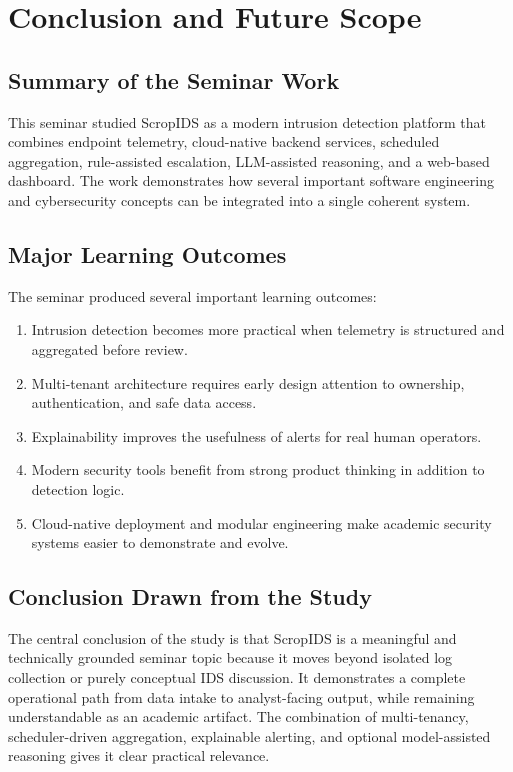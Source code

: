 \documentclass[12pt,a4paper]{report}
\begin{document}
\chapter{Conclusion and Future Scope}

\section{Summary of the Seminar Work}
This seminar studied ScropIDS as a modern intrusion detection platform that combines endpoint telemetry, cloud-native backend services, scheduled aggregation, rule-assisted escalation, LLM-assisted reasoning, and a web-based dashboard. The work demonstrates how several important software engineering and cybersecurity concepts can be integrated into a single coherent system.

\section{Major Learning Outcomes}
The seminar produced several important learning outcomes:
\begin{enumerate}
    \item Intrusion detection becomes more practical when telemetry is structured and aggregated before review.
    \item Multi-tenant architecture requires early design attention to ownership, authentication, and safe data access.
    \item Explainability improves the usefulness of alerts for real human operators.
    \item Modern security tools benefit from strong product thinking in addition to detection logic.
    \item Cloud-native deployment and modular engineering make academic security systems easier to demonstrate and evolve.
\end{enumerate}

\section{Conclusion Drawn from the Study}
The central conclusion of the study is that ScropIDS is a meaningful and technically grounded seminar topic because it moves beyond isolated log collection or purely conceptual IDS discussion. It demonstrates a complete operational path from data intake to analyst-facing output, while remaining understandable as an academic artifact. The combination of multi-tenancy, scheduler-driven aggregation, explainable alerting, and optional model-assisted reasoning gives it clear practical relevance.
\end{document}
